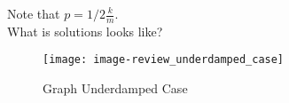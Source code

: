 Note that $p = 1/2 \frac{k}{m}$. \\
What is solutions looks like?
\begin{figure}[ht!]
  \centering
  \texttt{[image: image-review\_underdamped\_case]}
  \caption{Graph Underdamped Case }
\end{figure}


\clearpage 
